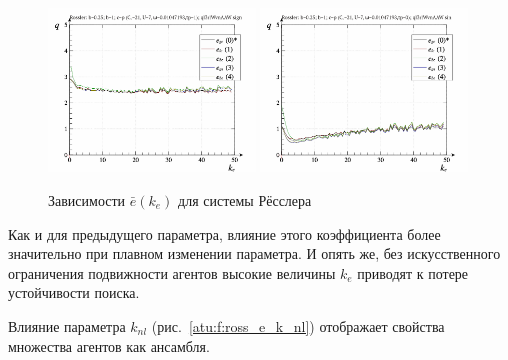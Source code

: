 \begin{figure}[ht!]
\begin{center}
  \includegraphics[width=0.49\textwidth]{p/cha/ross/ross_id-p_k_e_ql3rlWvnAAW_sign.png}
  \hfill
  \includegraphics[width=0.49\textwidth]{p/cha/ross/ross_id-p_k_e_ql3rlWvnAAW_sin.png}
\end{center}
  \caption{Зависимости $\bar{e}(k_e)$ для системы Рёсслера}
\label{atu:f:ross_e_k_e}
\end{figure}

Как и для предыдущего параметра, влияние этого коэффициента
более значительно при плавном изменении параметра.
И опять же, без искусственного ограничения подвижности агентов
высокие величины $k_e$ приводят к потере устойчивости поиска.

Влияние параметра $k_{nl}$ (рис.~\ref{atu:f:ross_e_k_nl})
отображает свойства множества агентов как ансамбля.

